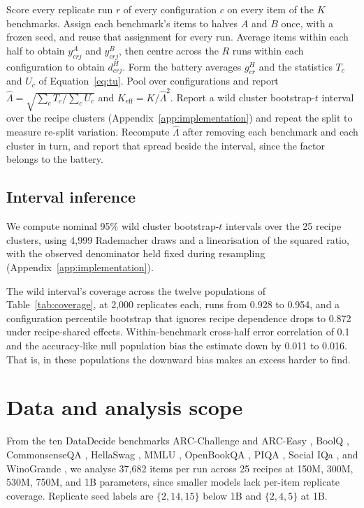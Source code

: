 \documentclass{article}
\newcommand{\Lam}{\Lambda}
\begin{document}
\begin{algorithm}[t]
\caption{SNAP measurement recipe for a fixed battery of $K$ benchmarks scored on $R$ replicate runs per configuration.}
\label{alg:snap}
\begin{algorithmic}[1]
\STATE Score every replicate run $r$ of every configuration $c$ on every item of the $K$ benchmarks.
\STATE Assign each benchmark's items to halves $A$ and $B$ once, with a frozen seed, and reuse that assignment for every run.
\STATE Average items within each half to obtain $y^A_{crj}$ and $y^B_{crj}$, then centre across the $R$ runs within each configuration to obtain $d^H_{crj}$.
\STATE Form the battery averages $g^H_{cr}$ and the statistics $T_c$ and $U_c$ of Equation~\ref{eq:tu}.
\STATE Pool over configurations and report $\widehat\Lam=\sqrt{\sum_c T_c/\sum_c U_c}$ and $K_{\mathrm{eff}}=K/\widehat\Lam^2$.
\STATE Report a wild cluster bootstrap-$t$ interval over the recipe clusters (Appendix~\ref{app:implementation}) and repeat the split to measure re-split variation.
\STATE Recompute $\widehat\Lam$ after removing each benchmark and each cluster in turn, and report that spread beside the interval, since the factor belongs to the battery.
\end{algorithmic}
\end{algorithm}


\subsection{Interval inference}
We compute nominal 95\% wild cluster bootstrap-$t$ intervals over the 25 recipe clusters, using 4,999 Rademacher draws and a linearisation of the squared ratio, with the observed denominator held fixed during resampling (Appendix~\ref{app:implementation}).

The wild interval's coverage across the twelve populations of Table~\ref{tab:coverage}, at 2,000 replicates each, runs from 0.928 to 0.954, and a configuration percentile bootstrap that ignores recipe dependence drops to 0.872 under recipe-shared effects. Within-benchmark cross-half error correlation of 0.1 and the accuracy-like null population bias the estimate down by 0.011 to 0.016. That is, in these populations the downward bias makes an excess harder to find.

\section{Data and analysis scope}
\label{sec:data}
From the ten DataDecide benchmarks ARC-Challenge and ARC-Easy \citep{clark2018arc}, BoolQ \citep{clark2019boolq}, CommonsenseQA \citep{talmor2019commonsenseqa}, HellaSwag \citep{zellers2019hellaswag}, MMLU \citep{hendrycks2021mmlu}, OpenBookQA \citep{mihaylov2018openbookqa}, PIQA \citep{bisk2020piqa}, Social IQa \citep{sap2019socialiqa}, and WinoGrande \citep{sakaguchi2020winogrande}, we analyse 37,682 items per run across 25 recipes at 150M, 300M, 530M, 750M, and 1B parameters, since smaller models lack per-item replicate coverage. Replicate seed labels are $\{2,14,15\}$ below 1B and $\{2,4,5\}$ at 1B.
\end{document}
